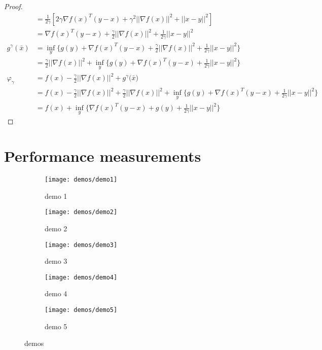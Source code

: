 \begin{proof}
\begin{align*}
	&= \frac{1}{2 \gamma}[ 2\gamma \nabla f(x)^T(y-x) + \gamma^2||\nabla f(x)||^2 + ||x-y||^2] \\
	&=  \nabla f(x)^T(y-x) +\frac{\gamma}{2}||\nabla f(x)||^2 + \frac{1}{2 \gamma} ||x-y||^2 \\
	g^{\gamma} (\bar{x})
	&=\underset{y}{\inf} \Big\{g(y)+ \nabla f(x)^T(y-x) +\frac{\gamma}{2}||\nabla f(x)||^2 + \frac{1}{2 \gamma} ||x-y||^2  \Big\} \\
	&= \frac{\gamma}{2}||\nabla f(x)||^2 + \underset{y}{\inf} \Big\{g(y)+ \nabla f(x)^T(y-x) + \frac{1}{2 \gamma} ||x-y||^2  \Big\} \\
	\varphi_{\gamma} 
	&= f(x) - \frac{\gamma}{2}||\nabla f(x)||^2 + g^{\gamma} \big(\bar{x} \big)\\
	&= f(x) - \frac{\gamma}{2}||\nabla f(x)||^2 +  \frac{\gamma}{2}||\nabla f(x)||^2 + \underset{y}{\inf} \Big\{g(y)+ \nabla f(x)^T(y-x) + \frac{1}{2 \gamma} ||x-y||^2  \Big\}\\
	&=   f(x) + \underset{y}{\inf} \Big\{ \nabla f(x)^T(y-x) + g(y) + \frac{1}{2 \gamma} ||x-y||^2  \Big\} 
	\end{align*}
	\label{prf:}
\end{proof}

\section{Performance measurements}
\begin{figure}[H]
	\centering
	\begin{subfigure}[b]{0.45\textwidth}
		\centering
		\texttt{[image: demos/demo1]}
		\caption{demo 1}
		\label{fig:demo 1}
	\end{subfigure}
	\hfill
	\begin{subfigure}[b]{0.45\textwidth}
		\centering
		\texttt{[image: demos/demo2]}
		\caption{demo 2}
		\label{fig:demo 2}
	\end{subfigure}
	\begin{subfigure}[b]{0.45\textwidth}
		\centering
		\texttt{[image: demos/demo3]}
		\caption{demo 3}
		\label{fig:demo 3}
	\end{subfigure}
	\hfill
	\begin{subfigure}[b]{0.45\textwidth}
		\centering
		\texttt{[image: demos/demo4]}
		\caption{demo 4}
		\label{fig:demo 4}
	\end{subfigure}
	\begin{subfigure}[b]{0.45\textwidth}
		\centering
		\texttt{[image: demos/demo5]}
		\caption{demo 5}
		\label{fig:demo 5}
	\end{subfigure}
	\caption{demos}
	\label{fig:demos}
\end{figure}

